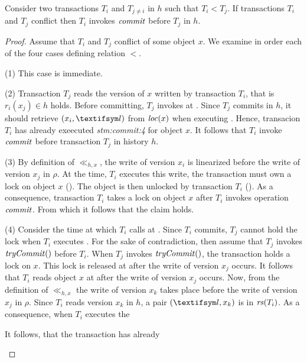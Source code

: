 \begin{proposition}
  Consider two transactions $T_i$ and $T_{j \neq i}$ in $h$ such that $T_i < T_j$.
  If transactions $T_i$ and $T_j$ conflict then $T_i$ invokes $\stmCommitFunction$ before $T_j$ in $h$.
\end{proposition}

\begin{proof}
  Assume that $T_i$ and $T_j$ conflict of some object $x$.
  We examine in order each of the four cases defining relation $<$.
  \begin{compactitem}
  \item[(1)]
    This case is immediate.
  \item[(2)]
    Transaction $T_j$ reads the version of $x$ written by transaction $T_i$, that is $r_i(x_j) \in h$ holds.
    Before committing, $T_j$ invokes \stmExtendFunction at .
    Since $T_j$ commits in $h$, it should retrieve $(x_i,\msgAny)$ from $\locationOf{x}$ when executing .
    Hence, transacion $T_i$ has already exeecuted \emph{stm:commit:4} for object $x$.
    It follows that $T_i$ invoke $\stmCommitFunction$ before transaction $T_j$ in history $h$.
  \item[(3)]
    By definition of $\ll_{h,x}$, the write of version $x_i$ is linearized before the write of version $x_j$ in $\rho$.
    At the time, $T_i$ executes this write, the transaction must own a lock on object $x$ ().
    The object is then unlocked by transaction $T_i$ ().
    As a consequence, transaction $T_i$ takes a lock on object $x$ after $T_i$ invokes operation $\stmCommitFunction$.
    From which it follows that the claim holds.
  \item[(4)]
    Consider the time at which $T_i$ calls \stmExtendFunction at .
    Since $T_i$ commits, $T_j$ cannot hold the lock when $T_i$ executes .
    For the sake of contradiction, then assume that $T_j$ invokes $\stmTryCommit$ before $T_i$.
    When $T_j$ invokes $\stmTryCommit$, the transaction holds a lock on $x$.
    This lock is released at  after the write of version $x_j$ occurs.    
    It follows that $T_i $ reads object $x$ at  after the write of version $x_j$ occurs.
    Now, from the definition of $\ll_{h,x}$ the write of version $x_k$ takes place before the write of version $x_j$ in $\rho$.
    Since $T_i$ reads version $x_k$ in $h$, a pair $(\msgAny,x_k)$ is in $\readSetOf{T_i}$.    
    As a consequence, when $T_i$ executes  the 
       
    
    It follows, that the transaction has already 
    
  \end{compactitem}
  
\end{proof}

